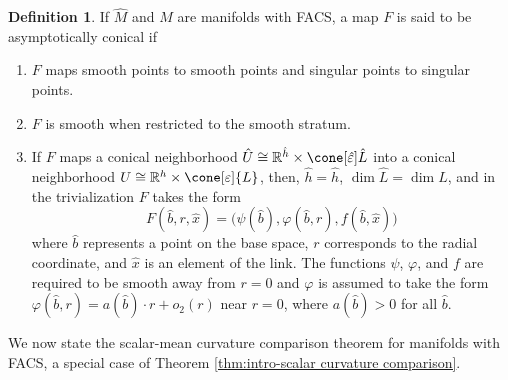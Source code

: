 \documentclass[12pt, reqno]{amsart}
\theoremstyle{plain} %
\theoremstyle{definition}
\newtheorem{definition}[theorem]{Definition}
\theoremstyle{remark}
\numberwithin{equation}{section}
\newcommand{\dom}[1]{\hat{#1}}
\newcommand{\field}[1]{\mathbb{#1}}
\newcommand{\R}{\field{R}}
\newcommand{\hdim}{h} %
\begin{document}
\begin{definition}
    If \(\dom{M}\) and \(M\) are manifolds with FACS, a map \(F\) is said to be asymptotically conical if
    \begin{enumerate}
        \item \(F\) maps smooth points to smooth points and singular points to singular points.
        \item \(F\) is smooth when restricted to the smooth stratum.
        \item If \(F\) maps a conical neighborhood \(\dom{U} \cong \R^{\dom{\hdim}} \times \cone[\dom{\varepsilon}]{\dom{L}}\) into a conical neighborhood \(U \cong \R^\hdim \times \cone[\varepsilon]{L}\), then, \(\dom{\hdim} = \dom{h}\), \(\dim \dom{L} = \dim L\), and in the trivialization \(F\) takes the form
            \begin{equation*}
                F(\dom{b},r,\dom{x}) = \big(\psi(\dom{b}), \varphi(\dom{b},r), f(\dom{b},\dom{x})\big)
            \end{equation*}
        where \(\dom{b}\) represents a point on the base space, \(r\) corresponds to the radial coordinate, and \(\dom{x}\) is an element of the link.
        The functions \(\psi\), \(\varphi\), and \(f\) are required to be smooth away from \(r=0\) and \(\varphi\) is assumed to take the form \(\varphi(\dom{b},r) = a(\dom{b}) \cdot r + o_2(r)\) near \(r=0\), where \(a(\dom{b}) > 0\) for all \(\dom{b}\).
    \end{enumerate}
\end{definition}

We now state the scalar-mean curvature comparison theorem for manifolds with FACS, a special case of Theorem \ref{thm:intro-scalar curvature comparison}.
\end{document}
